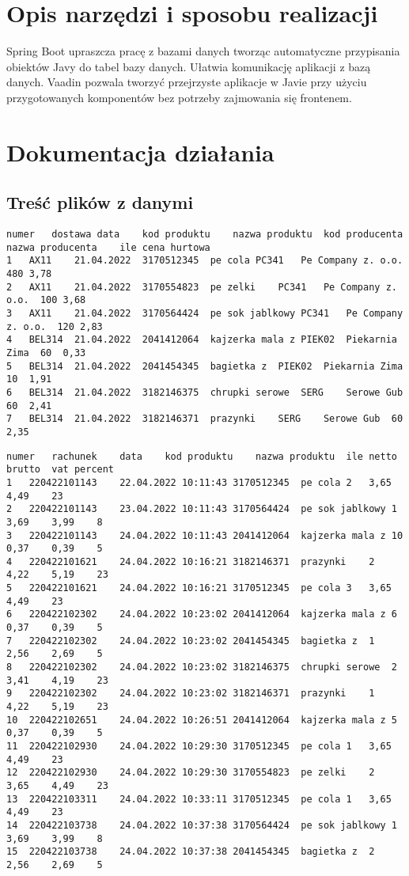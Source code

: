 \documentclass[a4paper,11pt]{article}
\begin{document}
\section{Opis narzędzi i sposobu realizacji}
Spring Boot upraszcza pracę z bazami danych tworząc automatyczne przypisania obiektów Javy 
do tabel bazy danych. Ułatwia komunikację aplikacji z bazą danych. 
Vaadin pozwala tworzyć przejrzyste aplikacje w Javie przy użyciu przygotowanych 
komponentów bez potrzeby zajmowania się frontenem.
\section{Dokumentacja działania}
\subsection{Treść plików z danymi}
\begin{lstlisting}
numer	dostawa	data	kod produktu	nazwa produktu	kod producenta	nazwa producenta	ile	cena hurtowa
1	AX11	21.04.2022	3170512345	pe cola	PC341	Pe Company z. o.o.	480	3,78
2	AX11	21.04.2022	3170554823	pe zelki	PC341	Pe Company z. o.o.	100	3,68
3	AX11	21.04.2022	3170564424	pe sok jablkowy	PC341	Pe Company z. o.o.	120	2,83
4	BEL314	21.04.2022	2041412064	kajzerka mala z	PIEK02	Piekarnia Zima	60	0,33
5	BEL314	21.04.2022	2041454345	bagietka z	PIEK02	Piekarnia Zima	10	1,91
6	BEL314	21.04.2022	3182146375	chrupki serowe	SERG	Serowe Gub	60	2,41
7	BEL314	21.04.2022	3182146371	prazynki	SERG	Serowe Gub	60	2,35
\end{lstlisting}

\begin{lstlisting}
numer	rachunek	data	kod produktu	nazwa produktu	ile	netto	brutto	vat percent
1	220422101143	22.04.2022 10:11:43	3170512345	pe cola	2	3,65	4,49	23
2	220422101143	23.04.2022 10:11:43	3170564424	pe sok jablkowy	1	3,69	3,99	8
3	220422101143	24.04.2022 10:11:43	2041412064	kajzerka mala z	10	0,37	0,39	5
4	220422101621	24.04.2022 10:16:21	3182146371	prazynki	2	4,22	5,19	23
5	220422101621	24.04.2022 10:16:21	3170512345	pe cola	3	3,65	4,49	23
6	220422102302	24.04.2022 10:23:02	2041412064	kajzerka mala z	6	0,37	0,39	5
7	220422102302	24.04.2022 10:23:02	2041454345	bagietka z	1	2,56	2,69	5
8	220422102302	24.04.2022 10:23:02	3182146375	chrupki serowe	2	3,41	4,19	23
9	220422102302	24.04.2022 10:23:02	3182146371	prazynki	1	4,22	5,19	23
10	220422102651	24.04.2022 10:26:51	2041412064	kajzerka mala z	5	0,37	0,39	5
11	220422102930	24.04.2022 10:29:30	3170512345	pe cola	1	3,65	4,49	23
12	220422102930	24.04.2022 10:29:30	3170554823	pe zelki	2	3,65	4,49	23
13	220422103311	24.04.2022 10:33:11	3170512345	pe cola	1	3,65	4,49	23
14	220422103738	24.04.2022 10:37:38	3170564424	pe sok jablkowy	1	3,69	3,99	8
15	220422103738	24.04.2022 10:37:38	2041454345	bagietka z	2	2,56	2,69	5
\end{lstlisting}
\end{document}
